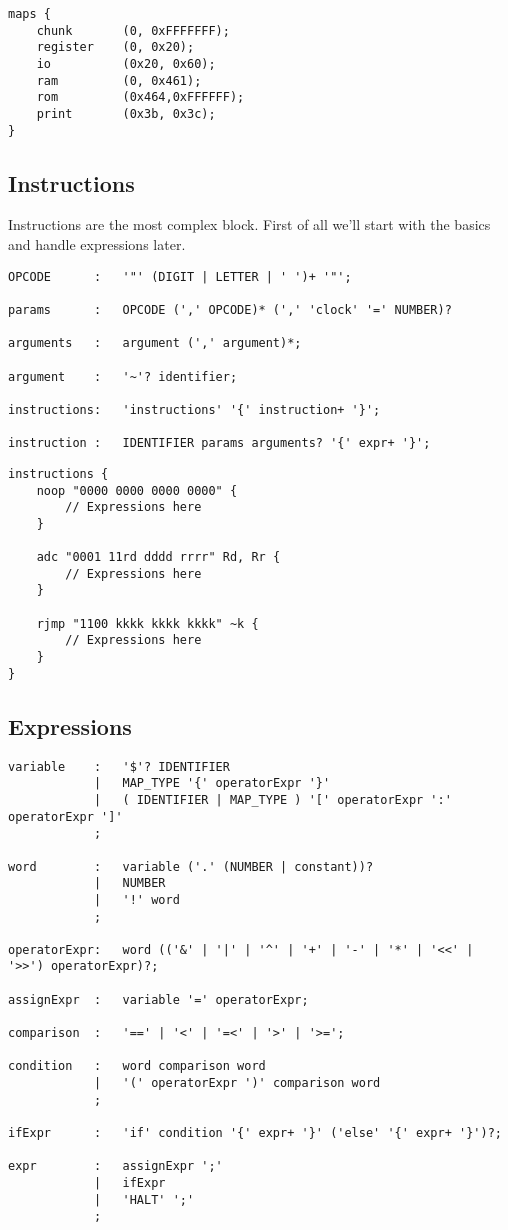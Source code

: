 \lstset{caption=Example memory mapping}
\begin{lstlisting}
maps {
	chunk		(0, 0xFFFFFFF);
	register	(0, 0x20);
	io			(0x20, 0x60);
	ram			(0, 0x461);
	rom			(0x464,0xFFFFFF);
	print		(0x3b, 0x3c);
}
\end{lstlisting}

\subsection{Instructions}
Instructions are the most complex block. First of all we'll start with the
basics and handle expressions later.
\lstset{caption=Instruction specification}
\begin{lstlisting}
OPCODE		:	'"' (DIGIT | LETTER | ' ')+ '"';

params		:	OPCODE (',' OPCODE)* (',' 'clock' '=' NUMBER)?

arguments	:	argument (',' argument)*;

argument	:	'~'? identifier;

instructions:	'instructions' '{' instruction+ '}';

instruction	:	IDENTIFIER params arguments? '{' expr+ '}';
\end{lstlisting}

\lstset{caption=Example instructions}
\begin{lstlisting}
instructions {
	noop "0000 0000 0000 0000" {
		// Expressions here
	}

	adc "0001 11rd dddd rrrr" Rd, Rr {
		// Expressions here
	}

	rjmp "1100 kkkk kkkk kkkk" ~k {
		// Expressions here
	}
}
\end{lstlisting}

\subsection{Expressions}
\lstset{caption=Expression specification}
\begin{lstlisting}
variable	:	'$'? IDENTIFIER
			|	MAP_TYPE '{' operatorExpr '}'
			|	( IDENTIFIER | MAP_TYPE ) '[' operatorExpr ':' operatorExpr ']'
			;

word 		:	variable ('.' (NUMBER | constant))?
			|	NUMBER
			|	'!' word
			;

operatorExpr:	word (('&' | '|' | '^' | '+' | '-' | '*' | '<<' | '>>') operatorExpr)?;

assignExpr	:	variable '=' operatorExpr;

comparison	:	'==' | '<' | '=<' | '>' | '>=';

condition	:	word comparison word
			|	'(' operatorExpr ')' comparison word
			;

ifExpr		:	'if' condition '{' expr+ '}' ('else' '{' expr+ '}')?;

expr		:	assignExpr ';'
			|	ifExpr
			|	'HALT' ';'
			;
\end{lstlisting}

